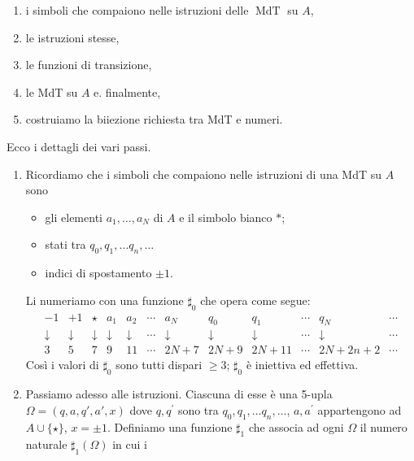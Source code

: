 \begin{enumerate}
    \item i simboli che compaiono nelle istruzioni delle $\operatorname{MdT}$ su $A$,
    \item le istruzioni stesse,
    \item le funzioni di transizione,
    \item le MdT su $A$ e. finalmente,
    \item costruiamo la biiezione richiesta tra MdT e numeri.
\end{enumerate}
Ecco i dettagli dei vari passi.
\begin{enumerate}
    \item Ricordiamo che i simboli che compaiono nelle istruzioni di una MdT su $A$
          sono
          \begin{itemize}
              \item gli elementi $a_1, \ldots, a_N$ di $A$ e il simbolo bianco $*$;
              \item stati tra $q_0, q_1, \ldots q_n, \ldots$
              \item indici di spostamento $\pm 1$.
          \end{itemize}
          Li numeriamo con
          una funzione $\sharp_0$ che opera come segue:
          $$
              \begin{array}{cccccccccccc}-1 & +1         &
             \star            & a_1        & a_2        & \cdots     & a_N        & q_0    & q_1    & \cdots & q_N       & \cdots \\
             \downarrow       & \downarrow & \downarrow & \downarrow & \downarrow & \cdots &
             \downarrow       & \downarrow & \downarrow & \cdots     & \downarrow & \cdots                                        \\ 3 & 5 & 7
                              & 9          & 11         & \cdots     & 2 N+7      & 2 N+9  & 2 N+11 & \cdots & 2 N+2 n+2 &
             \cdots\end{array}
          $$
          Così i valori di $\sharp_0$ sono tutti dispari $\ge 3$; $\sharp_0$ è
          iniettiva ed effettiva.
    \item  Passiamo adesso alle istruzioni. Ciascuna di esse è una 5-upla
          $\Omega=(q, a, q', a', x)$ dove $q, q^{\prime}$
          sono tra $q_0, q_1, \ldots q_n, \ldots$, $a, a^{\prime}$ appartengono ad
          $A \cup\{\star\}$, $x=\pm 1$. Definiamo una funzione $\sharp_1$ che
          associa ad ogni $\Omega$ il numero naturale $\sharp_1(\Omega)$ in cui i

\end{enumerate}
